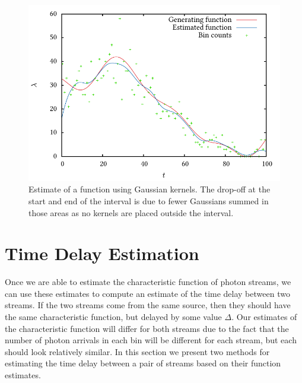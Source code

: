 \documentclass[a4paper,11pt]{article}
\begin{document}
   \begin{figure}[h]
   \includegraphics{images/gauss}
   \caption{Estimate of a function using Gaussian kernels. The drop-off at the
   start and end of the interval is due to fewer Gaussians summed in those areas
   as no kernels are placed outside the interval.}
   \label{fig:kde}
   \end{figure}
\section{Time Delay Estimation}
\label{sec-5}

  Once we are able to estimate the characteristic function of photon streams, we
  can use these estimates to compute an estimate of the time delay between two
  streams. If the two streams come from the same source, then they should have
  the same characteristic function, but delayed by some value $\Delta$. Our
  estimates of the characteristic function will differ for both streams due to
  the fact that the number of photon arrivals in each bin will be different for
  each stream, but each should look relatively similar. In this section we
  present two methods for estimating the time delay between a pair of streams
  based on their function estimates.
\end{document}
